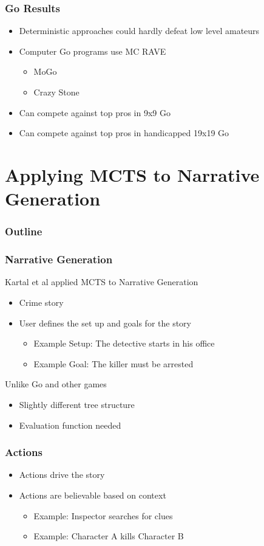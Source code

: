 \documentclass{beamer}
\begin{document}
\begin{frame}
\frametitle{Go Results}
\begin{itemize}
	\item Deterministic approaches could hardly defeat low level amateurs
	\item Computer Go programs use MC RAVE
	\begin{itemize}
		\item MoGo
		\item Crazy Stone
	\end{itemize}
	\item Can compete against top pros in 9x9 Go
	\item Can compete against top pros in handicapped 19x19 Go
\end{itemize}
\end{frame}

\section{Applying MCTS to Narrative Generation}

\begin{frame}
\frametitle{Outline}
\tableofcontents[currentsection]
\end{frame}

\begin{frame}
\frametitle{Narrative Generation}
Kartal et al applied MCTS to Narrative Generation
\begin{itemize}
	\item Crime story
	\item User defines the set up and goals for the story
	\begin{itemize}
		\item Example Setup: The detective starts in his office
		\item Example Goal: The killer must be arrested
	\end{itemize}
\end{itemize}
Unlike Go and other games
\begin{itemize}
	\item Slightly different tree structure
	\item Evaluation function needed
\end{itemize}
\end{frame}

\begin{frame}
\frametitle{Actions}
\begin{itemize}
	\item Actions drive the story
	\item Actions are believable based on context
		\begin{itemize}
			\item Example: Inspector searches for clues
			\item Example: Character A kills Character B
		\end{itemize}
\end{itemize}
\end{frame}
\end{document}
